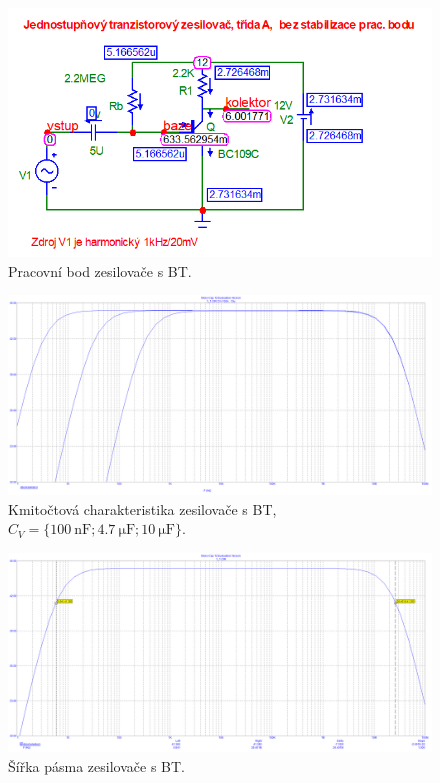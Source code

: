 \documentclass{protokol}
\begin{document}
	\begin{figure}[h!]
		\centering
		\includegraphics[width=\textwidth]{microcap/BJT/1_Pracovni_bod_zesilovace.png}
		\centering
		\caption{Pracovní bod zesilovače s BT.}
		\label{fig:mc_bt_prac_bod}
	\end{figure}

	\begin{figure}[h!]
		\centering
		\includegraphics[width=\textwidth]{microcap/BJT/Frekvecni_prubeh_Cv_step.png}
		\centering
		\caption{Kmitočtová charakteristika zesilovače s BT, $ C_V= \{\SI{100}{\nano\farad};\SI{4.7}{\micro\farad};\SI{10}{\micro\farad}\} $.}
		\label{fig:-mc_}
	\end{figure}
	
	\begin{figure}[h!]
		\centering
		\includegraphics[width=\textwidth]{microcap/BJT/Frekvecni_prubeh.png}
		\centering
		\caption{Šířka pásma zesilovače s BT.}
		\label{fig:-mc_}
	\end{figure}
	
\end{document}

